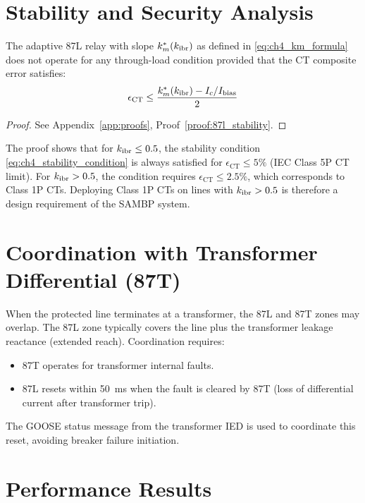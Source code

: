 \section{Stability and Security Analysis}
\label{sec:ch4_stability}

\begin{proposition}
\label{prop:ch4_stability}
The adaptive 87L relay with slope $k_m^\ast(k_\mathrm{ibr})$ as defined in
\eqref{eq:ch4_km_formula} does not operate for any through-load condition
provided that the CT composite error satisfies:
\begin{equation}
  \epsilon_\mathrm{CT} \leq \frac{k_m^\ast(k_\mathrm{ibr}) - I_c/I_\mathrm{bias}}{2}
  \label{eq:ch4_stability_condition}
\end{equation}
\end{proposition}

\begin{proof}
See Appendix~\ref{app:proofs}, Proof~\ref{proof:87l_stability}.
\end{proof}

The proof shows that for $k_\mathrm{ibr} \leq 0.5$, the stability condition
\eqref{eq:ch4_stability_condition} is always satisfied for
$\epsilon_\mathrm{CT} \leq 5\%$ (IEC Class 5P CT limit). For
$k_\mathrm{ibr} > 0.5$, the condition requires $\epsilon_\mathrm{CT} \leq 2.5\%$,
which corresponds to Class 1P CTs. Deploying Class 1P CTs on lines with
$k_\mathrm{ibr} > 0.5$ is therefore a design requirement of the SAMBP system.

\section{Coordination with Transformer Differential (87T)}
\label{sec:ch4_87t_coord}

When the protected line terminates at a transformer, the 87L and 87T zones
may overlap. The 87L zone typically covers the line plus the transformer
leakage reactance (extended reach). Coordination requires:
\begin{itemize}
\item 87T operates for transformer internal faults.
\item 87L resets within 50~ms when the fault is cleared by 87T
  (loss of differential current after transformer trip).
\end{itemize}
The GOOSE status message from the transformer IED is used to coordinate
this reset, avoiding breaker failure initiation.

\section{Performance Results}
\label{sec:ch4_results}

